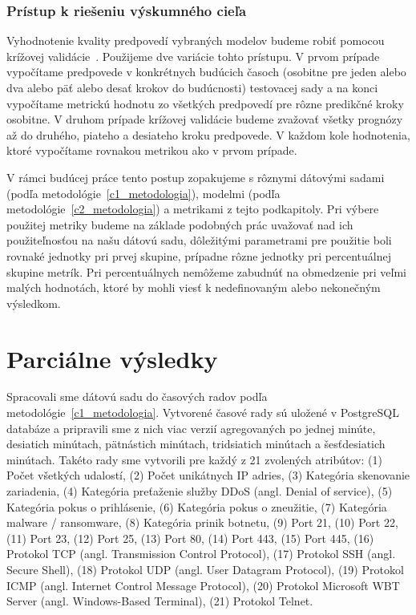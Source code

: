 \documentclass[thesismargins, thesislinespacing, openright, upjsfrontpage, combineabstracts]{rnthesis}
\begin{document}
\subsection{Prístup k riešeniu výskumného cieľa}
 
Vyhodnotenie kvality predpovedí vybraných modelov budeme robiť pomocou krížovej validácie~\cite{hyndman2018forecasting}. Použijeme dve variácie tohto prístupu. V prvom prípade vypočítame predpovede v konkrétnych budúcich časoch (osobitne pre jeden alebo dva alebo päť alebo desať krokov do budúcnosti) testovacej sady a na konci vypočítame metrickú hodnotu zo všetkých predpovedí pre rôzne predikčné kroky osobitne.  V druhom prípade krížovej validácie budeme zvažovať všetky prognózy až do druhého, piateho a desiateho kroku predpovede. V každom kole hodnotenia, ktoré vypočítame rovnakou metrikou ako v prvom prípade.

V rámci budúcej práce tento postup zopakujeme s rôznymi dátovými sadami (podľa metodológie~\ref{c1_metodologia}), modelmi (podľa metodológie~\ref{c2_metodologia}) a metrikami z tejto podkapitoly. Pri výbere použitej metriky budeme na základe podobných prác uvažovať nad ich použiteľnosťou na našu dátovú sadu, dôležitými parametrami pre použitie boli rovnaké jednotky pri prvej skupine, prípadne rôzne jednotky pri percentuálnej skupine metrík. Pri percentuálnych nemôžeme zabudnúť na obmedzenie pri veľmi malých hodnotách, ktoré by mohli viesť k nedefinovaným alebo nekonečným výsledkom.

\chapter{Parciálne výsledky}

Spracovali sme dátovú sadu do časových radov podľa metodológie~\ref{c1_metodologia}. Vytvorené časové rady sú uložené v PostgreSQL databáze a pripravili sme z nich viac verzií agregovaných po jednej minúte, desiatich minútach, pätnástich minútach, tridsiatich minútach a šesťdesiatich minútach. Takéto rady sme vytvorili pre každý z 21 zvolených atribútov: (1) Počet všetkých udalostí, (2) Počet unikátnych IP adries, (3)  Kategória skenovanie zariadenia, (4) Kategória preťaženie služby DDoS (angl. Denial of service), (5) Kategória pokus o prihlásenie, (6) Kategória pokus o zneužitie, (7) Kategória malware / ransomware, (8) Kategória prinik botnetu, (9) Port 21, (10) Port 22, (11) Port 23, (12) Port 25, (13) Port 80, (14) Port 443, (15) Port 445, (16) Protokol TCP (angl. Transmission Control Protocol), (17) Protokol SSH (angl. Secure Shell), (18) Protokol UDP (angl. User Datagram Protocol), (19) Protokol ICMP (angl. Internet Control Message Protocol), (20) Protokol Microsoft WBT Server (angl. Windows-Based Terminal), (21) Protokol Telnet.
\end{document}

